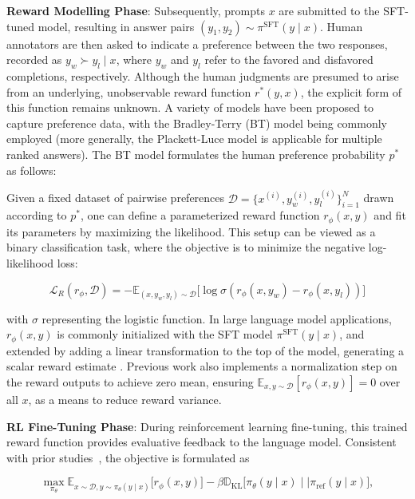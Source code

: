 \textbf{Reward Modelling Phase}: Subsequently, prompts $x$ are submitted to the SFT-tuned model, resulting in answer pairs $(y_1, y_2)\sim \pi^\text{SFT}(y \mid x)$. Human annotators are then asked to indicate a preference between the two responses, recorded as $y_w\succ y_l \mid x$, where $y_w$ and $y_l$ refer to the favored and disfavored completions, respectively. Although the human judgments are presumed to arise from an underlying, unobservable reward function $r^*(y, x)$, the explicit form of this function remains unknown. A variety of models have been proposed to capture preference data, with the Bradley-Terry (BT) model \cite{bradley1952rankanalysis} being commonly employed (more generally, the Plackett-Luce model \citep{plackett1975analysis, luce2012individual} is applicable for multiple ranked answers). The BT model formulates the human preference probability $p^*$ as follows:

Given a fixed dataset of pairwise preferences $\mathcal{D}=\bigl\{x^{(i)}, y_w^{(i)}, y_l^{(i)}\bigr\}_{i=1}^N$ drawn according to $p^*$, one can define a parameterized reward function $r_{\phi}(x, y)$ and fit its parameters by maximizing the likelihood. This setup can be viewed as a binary classification task, where the objective is to minimize the negative log-likelihood loss:

\begin{equation}\label{eq:reward_model}
    \mathcal{L}_R(r_{\phi}, \mathcal{D}) = -\mathbb{E}_{(x, y_w, y_l)\sim \mathcal{D}}\bigl[\log \sigma(r_{\phi}(x, y_w)- r_{\phi}(x, y_l))\bigr]
\end{equation}

with $\sigma$ representing the logistic function. In large language model applications, $r_{\phi}(x, y)$ is commonly initialized with the SFT model $\pi^\text{SFT}(y \mid x)$, and extended by adding a linear transformation to the top of the model, generating a scalar reward estimate \cite{ziegler2020finetuning}. Previous work also implements a normalization step on the reward outputs to achieve zero mean, ensuring $\mathbb{E}_{x,y\sim \mathcal{D}}\left[r_\phi(x, y)\right] = 0$ over all $x$, as a means to reduce reward variance.

\textbf{RL Fine-Tuning Phase}: During reinforcement learning fine-tuning, this trained reward function provides evaluative feedback to the language model. Consistent with prior studies~\citep{jaques2017sequence, jaques2020human}, the objective is formulated as

\begin{equation}\label{eq:RL}
\max_{\pi_{\theta}}  \mathbb{E}_{x\sim \mathcal{D}, y\sim \pi_{\theta}(y \mid x)}\bigl[r_{\phi}(x, y)\bigr] - \beta\mathbb{D}_{\textrm{KL}}\bigl[\pi_{\theta}(y\mid x)\mid \mid \pi_\text{ref}(y\mid x)\bigr],
\end{equation}


